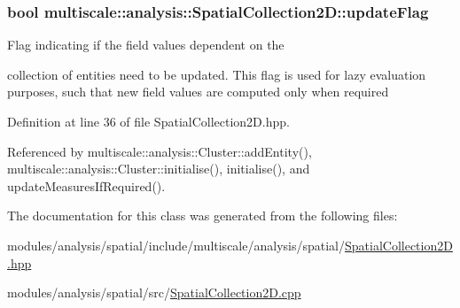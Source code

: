 \hypertarget{classmultiscale_1_1analysis_1_1SpatialCollection2D_a6d942f2856adc673e9d361596744b37f}{
\subsubsection[{update\-Flag}]{\setlength{\rightskip}{0pt plus 5cm}bool multiscale\-::analysis\-::\-Spatial\-Collection2\-D\-::update\-Flag\hspace{0.3cm}{\ttfamily [protected]}}}\label{classmultiscale_1_1analysis_1_1SpatialCollection2D_a6d942f2856adc673e9d361596744b37f}
\begin{DoxyVerb}                Flag indicating if the field values dependent on the
\end{DoxyVerb}
 collection of entities need to be updated. This flag is used for lazy evaluation purposes, such that new field values are computed only when required 

Definition at line 36 of file Spatial\-Collection2\-D.\-hpp.



Referenced by multiscale\-::analysis\-::\-Cluster\-::add\-Entity(), multiscale\-::analysis\-::\-Cluster\-::initialise(), initialise(), and update\-Measures\-If\-Required().



The documentation for this class was generated from the following files\-:\begin{DoxyCompactItemize}
\item 
modules/analysis/spatial/include/multiscale/analysis/spatial/\hyperlink{SpatialCollection2D_8hpp}{Spatial\-Collection2\-D.\-hpp}\item 
modules/analysis/spatial/src/\hyperlink{SpatialCollection2D_8cpp}{Spatial\-Collection2\-D.\-cpp}\end{DoxyCompactItemize}
